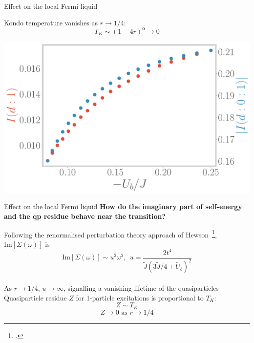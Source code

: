 \documentclass[9pt,aspectratio=169]{beamer}
\begin{document}
\begin{frame}{Effect on the local Fermi liquid}
\begin{itemize}
{	\begin{minipage}{0.45\textwidth}
	\nitem Kondo temperature vanishes as \(r \to 1/4\):
	\[T_K \sim (1- 4r)^\alpha \to 0\]
	\end{minipage}
	\hspace*{\fill}
	\begin{minipage}{0.45\textwidth}
	\includegraphics[width=\textwidth]{tripartite.pdf}
	\end{minipage}
}
\end{itemize}
\end{frame}

\begin{frame}{Effect on the local Fermi liquid}
	\textbf{How do the imaginary part of \alert{self-energy} and the \alert{qp residue} behave near the transition?}
	\vspace*{\fill}

\begin{itemize}
	\nitem Following the renormalised perturbation theory approach of Hewson~\footcite{hewson1993,coleman2015}, \(\text{Im}\left[\Sigma(\omega)\right] \) is
	\[\text{Im}\left[\Sigma(\omega)\right] \sim u^2 \omega^2, ~ ~ u = \frac{2t^4}{\tilde J\left(3\tilde J/4 + \tilde U_b \right)^2}\]\\[10pt]
	\nitem As \(r \to 1/4\), \(u \to \infty\), signalling a vanishing lifetime of the quasiparticles\\[20pt]
	\nitem Quasiparticle residue \(Z\) for 1-particle excitations is proportional to \(T_K\):
	\[Z \sim T_K\]
	\[Z \to 0 \text{ as }r \to 1/4\]
\end{itemize}
\end{frame}
\end{document}

